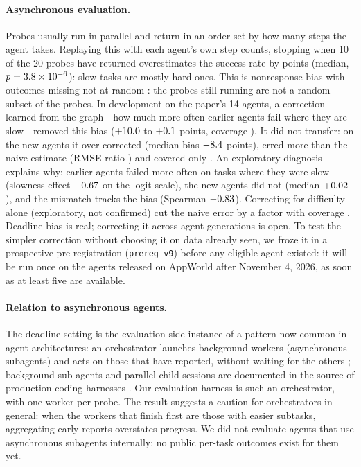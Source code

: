 \documentclass[11pt]{article}
\begin{document}
\paragraph{Asynchronous evaluation.} Probes usually run in parallel and return in an order set by how many steps the
agent takes. Replaying this with each agent's own step counts, stopping when 10 of the 20 probes have returned
overestimates the success rate by \BiasNaiveEight{} points (median, $p=3.8\times10^{-6}$): slow tasks are mostly hard ones.
This is nonresponse bias with outcomes missing not at random \citep{little2019}: the probes still running are not a
random subset of the probes. In
development on the paper's 14 agents, a correction learned from the graph---how much more often earlier agents fail
where they are slow---removed this bias ($+10.0$ to $+0.1$ points, coverage
\DevCovEight). It did not transfer: on the new agents it over-corrected (median bias $-8.4$ points), erred
more than the naive estimate (RMSE ratio \RmseRatioEight) and covered only \CovDeadlineEight. An exploratory diagnosis
explains why: earlier agents failed more often on tasks where they were slow (slowness effect $-0.67$ on the
logit scale), the new agents did not (median $+0.02$), and the mismatch tracks the bias (Spearman
$-0.83$). Correcting for difficulty alone (exploratory, not confirmed) cut the naive error by a factor
\DiffOnlyRatio{} with coverage \DiffOnlyCov. Deadline bias is real; correcting it across agent generations is open. To test the simpler correction without
choosing it on data already seen, we froze it in a prospective pre-registration (\texttt{prereg-v9}) before any
eligible agent existed: it will be run once on the agents released on AppWorld after November 4, 2026, as soon as at
least five are available.

\paragraph{Relation to asynchronous agents.} The deadline setting is the evaluation-side instance of a pattern now
common in agent architectures: an orchestrator launches background workers (asynchronous subagents) and acts on those
that have reported, without waiting for the others \citep{runkle2026async}; background sub-agents and parallel child
sessions are documented in the source of production coding harnesses \citep{barbaste2026harness}. Our evaluation harness is such an
orchestrator, with one worker per probe. The result suggests a caution for orchestrators in general: when the workers
that finish first are those with easier subtasks, aggregating early reports overstates progress. We did not evaluate
agents that use asynchronous subagents internally; no public per-task outcomes exist for them yet.
\end{document}
